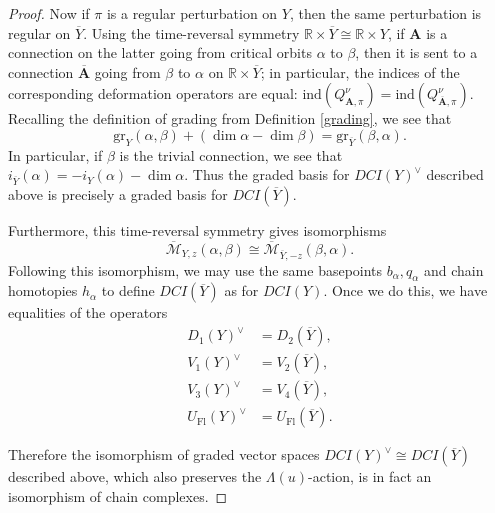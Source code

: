 \documentclass{memo-l}
\theoremstyle{definition}
\theoremstyle{remark}
\numberwithin{section}{chapter}
\numberwithin{equation}{chapter}
\begin{document}
\begin{proof}
Now if $\pi$ is a regular perturbation on $Y$, then the same perturbation is regular on $\overline Y$. Using the time-reversal symmetry $\mathbb R \times \overline Y \cong \mathbb R \times Y$, if $\mathbf{A}$ is a connection on the latter going from critical orbits $\alpha$ to $\beta$, then it is sent to a connection $\overline{\mathbf{A}}$ going from $\beta$ to $\alpha$ on $\mathbb R \times \overline Y$; in particular, the indices of the corresponding deformation operators are equal: $\text{ind}(Q^\nu_{\mathbf{A},\pi}) = \text{ind}(Q^\nu_{\overline{\mathbf{A}},\pi})$. Recalling the definition of grading from Definition \ref{grading}, we see that $$\text{gr}_Y(\alpha, \beta) + (\dim \alpha - \dim \beta) = \text{gr}_{\overline Y}(\beta, \alpha).$$ In particular, if $\beta$ is the trivial connection, we see that $i_{\overline Y}(\alpha) = -i_Y(\alpha) - \dim \alpha$. Thus the graded basis for $DCI(Y)^\vee$ described above is precisely a graded basis for $DCI(\overline Y)$.

Furthermore, this time-reversal symmetry gives isomorphisms $$\overline{\mathcal M}_{Y,z}(\alpha, \beta) \cong \overline{\mathcal M}_{\overline Y, -z}(\beta, \alpha).$$ Following this isomorphism, we may use the same basepoints $b_\alpha, q_\alpha$ and chain homotopies $h_\alpha$ to define $DCI(\overline Y)$ as for $DCI(Y)$. Once we do this, we have equalities of the operators
\begin{align*}D_1(Y)^\vee &= D_2(\overline Y),\\
V_1(Y)^\vee &= V_2(\overline Y),\\
V_3(Y)^\vee &= V_4(\overline Y),\\
U_{\text{Fl}}(Y)^\vee &= U_{\text{Fl}}(\overline Y).
\end{align*}

Therefore the isomorphism of graded vector spaces $DCI(Y)^\vee \cong DCI(\overline Y)$ described above, which also preserves the $\Lambda(u)$-action, is in fact an isomorphism of chain complexes. 
\end{proof}
\end{document}
